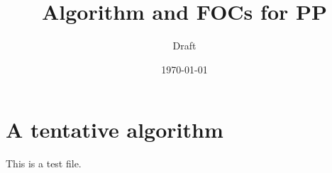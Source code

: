\documentclass{article}
\title{Algorithm and FOCs for PP}
\author{Draft}
\date{\today}
\begin{document}
\maketitle
\section{A tentative algorithm}
	This is a test file.
\end{document}

